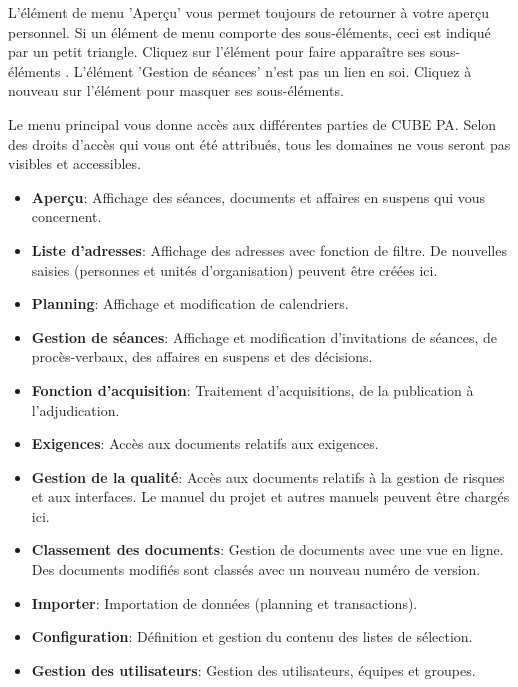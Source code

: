 \vspace{\baselineskip}

L'élément de menu 'Aperçu'  vous permet toujours de retourner à votre aperçu personnel. Si un élément de menu comporte des sous-éléments, ceci est indiqué par un petit triangle. Cliquez sur l'élément pour faire apparaître ses sous-éléments . L'élément 'Gestion de séances' n'est pas un lien en soi. Cliquez à nouveau sur l'élément pour masquer ses sous-éléments.

\vspace{\baselineskip}

Le menu principal vous donne accès aux différentes parties de CUBE PA. Selon des droits d'accès qui vous ont été attribués, tous les domaines ne vous seront pas visibles et accessibles.

\begin{itemize}
\item
\textbf{Aperçu}: Affichage des séances, documents et affaires en suspens qui vous concernent.
\item
\textbf{Liste d'adresses}: Affichage des adresses avec fonction de filtre. De nouvelles saisies (personnes et unités d'organisation) peuvent être créées ici.
\item
\textbf{Planning}: Affichage et modification de calendriers.
\item
\textbf{Gestion de séances}: Affichage et modification d'invitations de séances, de procès-verbaux, des affaires en suspens et des décisions.
\item
\textbf{Fonction d'acquisition}: Traitement d'acquisitions, de la publication à l'adjudication.
\item
\textbf{Exigences}: Accès aux documents relatifs aux exigences.
\item
\textbf{Gestion de la qualité}: Accès aux documents relatifs à la gestion de risques et aux interfaces. Le manuel du projet et autres manuels peuvent être chargés ici.
\item
\textbf{Classement des documents}: Gestion de documents avec une vue en ligne. Des documents modifiés sont classés avec un nouveau numéro de version.
\item
\textbf{Importer}: Importation de données (planning et transactions).
\item
\textbf{Configuration}: Définition et gestion du contenu des listes de sélection.
\item
\textbf{Gestion des utilisateurs}: Gestion des utilisateurs, équipes et groupes.
\end{itemize}

